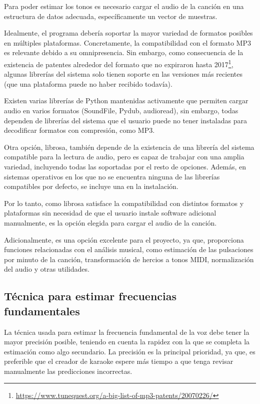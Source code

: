 Para poder estimar los tonos es necesario cargar el audio de la canción en una estructura de datos adecuada, específicamente un vector de muestras.

Idealmente, el programa debería soportar la mayor variedad de formatos posibles en múltiples plataformas. Concretamente, la compatibilidad con el formato MP3 es relevante debido a su omnipresencia. Sin embargo, como consecuencia de la existencia de patentes alrededor del formato que no expiraron hasta 2017\footnote{\url{https://www.tunequest.org/a-big-list-of-mp3-patents/20070226/}}, algunas librerías del sistema solo tienen soporte en las versiones más recientes (que una plataforma puede no haber recibido todavía).

Existen varias librerías de Python mantenidas activamente que permiten cargar audio en varios formatos (SoundFile, Pydub, audioread), sin embargo, todas dependen de librerías del sistema que el usuario puede no tener instaladas para decodificar formatos con compresión, como MP3. 

Otra opción, librosa, también depende de la existencia de una librería del sistema compatible para la lectura de audio, pero es capaz de trabajar con una amplia variedad, incluyendo todas las soportadas por el resto de opciones. Además, en sistemas operativos en los que no se encuentra ninguna de las librerías compatibles por defecto, se incluye una en la instalación.

Por lo tanto, como librosa satisface la compatibilidad con distintos formatos y plataformas sin necesidad de que el usuario instale software adicional manualmente, es la opción elegida para cargar el audio de la canción.

Adicionalmente, es una opción excelente para el proyecto, ya que, proporciona funciones relacionadas con el análisis musical, como estimación de las pulsaciones por minuto de la canción, transformación de hercios a tonos MIDI, normalización del audio y otras utilidades.

\subsection{Técnica para estimar frecuencias fundamentales}

La técnica usada para estimar la frecuencia fundamental de la voz debe tener la mayor precisión posible, teniendo en cuenta la rapidez con la que se completa la estimación como algo secundario. La precisión es la principal prioridad, ya que, es preferible que el creador de karaoke espere más tiempo a que tenga revisar manualmente las predicciones incorrectas.

